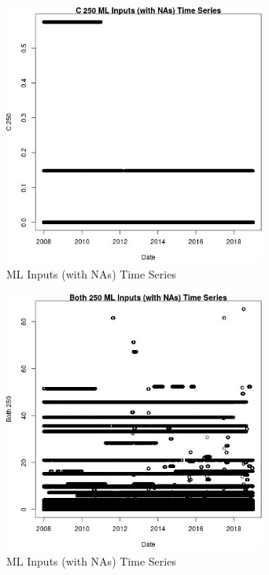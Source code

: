 \begin{figure} 
\centering  
\includegraphics[width=0.77\textwidth]{Code_Outputs/Report_ML_input_PM25_Step4_part_f_de_duplicated_aveswNAs_C_250vDate.jpg} 
\caption{\label{fig:Report_ML_input_PM25_Step4_part_f_de_duplicated_aveswNAsC_250vDate}ML Inputs (with NAs) Time Series} 
\end{figure} 
 

\begin{figure} 
\centering  
\includegraphics[width=0.77\textwidth]{Code_Outputs/Report_ML_input_PM25_Step4_part_f_de_duplicated_aveswNAs_Both_250vDate.jpg} 
\caption{\label{fig:Report_ML_input_PM25_Step4_part_f_de_duplicated_aveswNAsBoth_250vDate}ML Inputs (with NAs) Time Series} 
\end{figure} 
 

